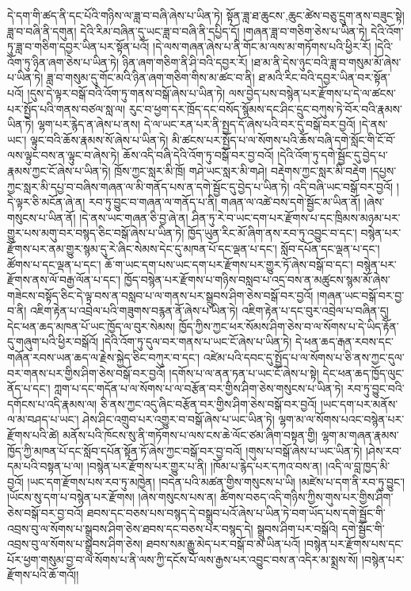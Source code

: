 དེ་དག་གི་ཚད་ནི་དང་པོའི་གཉིས་ལ་ཟླ་བ་བཞི་ཞེས་པ་ཡིན་ཏེ། སྟོན་ཟླ་ཐ་{ཆུངས་,ཆུང་}ཚེས་བཅུ་དྲུག་ནས་བཟུང་སྟེ། ཟླ་བ་བཞི་ནི་དགུན། དེའི་རིམ་བཞིན་དུ་ཡང་ཟླ་བ་བཞི་ནི་དཔྱིད་དོ། །གཞན་ཟླ་བ་གཅིག་ཅེས་པ་ཡིན་ཏེ། དེའི་འོག་ཏུ་ཟླ་བ་གཅིག་དབྱར་ཡིན་པར་སྟོན་པའོ། །དེ་ལས་གཞན་ཞེས་པ་ནི་གོང་མ་ལས་མ་གཏོགས་པའི་ཕྱིར་རོ། །དེའི་འོག་ཏུ་ཉིན་ཞག་ཅེས་པ་ཡིན་ཏེ། ཉིན་ཞག་གཅིག་ནི་ཤི་བའི་དབྱར་རོ། །ཐ་མ་ནི་དེས་ཉུང་བའི་ཟླ་བ་གསུམ་མོ་ཞེས་པ་ཡིན་ཏེ། ཟླ་བ་གསུམ་དུ་གོང་མའི་ཉིན་ཞག་གཅིག་གིས་མ་ཚང་བ་ནི། ཐ་མའི་རིང་བའི་དབྱར་ཡིན་བར་སྟོན་པའོ། །དུས་དེ་ལྟར་བསྒོ་བའི་འོག་ཏུ་གནས་བསྒོ་ཞེས་པ་ཡིན་ཏེ། ལས་བྱེད་པས་བསྙེན་པར་རྫོགས་པ་དེ་ལ་ཚངས་པར་སྤྱོད་པའི་གནས་བཙལ་སླ་ལ། རུང་བ་ཕྱག་དར་ཁྲོད་དང་བསོད་སྙོམས་དང་ཤིང་དྲུང་བཀུས་ཏེ་བོར་བའི་རྣམས་ཡིན་ཏེ། ལྷག་པར་རྙེད་ན་ཞེས་པ་ནས། དེ་ལ་ཡང་རན་པར་ནི་སྤྱད་དོ་ཞེས་པའི་བར་དུ་བསྒོ་བར་བྱའོ། །དེ་ནས་ཡང་། ལྟུང་བའི་ཆོས་རྣམས་སོ་ཞེས་པ་ཡིན་ཏེ། མི་ཚངས་པར་སྤྱོད་པ་ལ་སོགས་པའི་ཆོས་བཞི་དགེ་སློང་གི་ངོ་བོ་ལས་ལྟུང་བས་ན་ལྟུང་བ་ཞེས་ཏེ། ཆོས་འདི་བཞི་དེའི་འོག་ཏུ་བསྒོ་བར་བྱ་བའོ། །དེའི་འོག་ཏུ་དགེ་སྦྱོང་དུ་བྱེད་པ་རྣམས་ཀྱང་ངོ་ཞེས་པ་ཡིན་ཏེ། ཁྲོས་ཀྱང་སླར་མི་ཁྲོ། གཤེ་ཡང་སླར་མི་གཤེ། བརྡེགས་ཀྱང་སླར་མི་བརྡེག །དཔྱས་ཀྱང་སླར་མི་དཔྱ་བ་བཞིས་གཞན་ལ་མི་གནོད་པས་ན་དགེ་སྦྱོང་དུ་བྱེད་པ་ཡིན་ཏེ། འདི་བཞི་ཡང་བསྒོ་བར་བྱའོ། །དེ་ལྟར་ཅི་མངོན་ཞེ་ན། རབ་ཏུ་བྱུང་བ་གཞན་ལ་གནོད་པ་ནི། གཞན་ལ་འཚེ་བས་དགེ་སྦྱོང་མ་ཡིན་ནོ། །ཞེས་གསུངས་པ་ཡིན་ནོ། །དེ་ནས་ཡང་གཞན་ཅི་བྱ་ཞེ་ན། ཤིན་ཏུ་རེ་བ་ཡང་དག་པར་རྫོགས་པ་དང་ཁྲིམས་མཉམ་པར་གྱུར་པས་མགུ་བར་བསྙད་ཅིང་བསྒོ་ཞེས་པ་ཡིན་ཏེ། ཁྱོད་ཡུན་རིང་མོ་ཞིག་ནས་རབ་ཏུ་འབྱུང་བ་དང་། བསྙེན་པར་རྫོགས་པར་ནམ་གྱུར་སྙམ་དུ་རེ་ཞིང་སེམས་དེང་དུ་མཁན་པོ་དང་ལྡན་པ་དང་། སློབ་དཔོན་དང་ལྡན་པ་དང་། ཚོགས་པ་དང་ལྡན་པ་དང་། ཆོ་ག་ཡང་དག་པས་ཡང་དག་པར་རྫོགས་པར་གྱུར་ཏོ་ཞེས་བསྒོ་བ་དང་། བསྙེན་པར་རྫོགས་ནས་ལོ་བརྒྱ་ལོན་པ་དང་། ཁྱོད་བསྙེན་པར་རྫོགས་པ་གཉིས་བསླབ་པ་འདྲ་བས་ན་མཚུངས་སྙམ་མོ་ཞེས་གཟེངས་བསྟོད་ཅིང་དེ་ལྟ་བས་ན་བསླབ་པ་ལ་གནས་པར་སྒྲུབས་ཤིག་ཅེས་བསྒོ་བར་བྱའོ། །གཞན་ཡང་བསྒོ་བར་བྱ་བ་ནི། འཇིག་རྟེན་པ་འབྲེལ་པའི་གཟུགས་བརྙན་ནོ་ཞེས་པ་ཡིན་ཏེ། འཇིག་རྟེན་པ་དང་བུར་འབྲེལ་པ་བཞིན་དུ། དེང་ཕན་ཆད་མཁན་པོ་ཡང་ཁྱོད་ལ་བུར་སེམས། ཁྱོད་ཀྱིས་ཀྱང་ཕར་སོམས་ཤིག་ཅེས་བ་ལ་སོགས་པ་དེ་ཡིད་རྟོན་དུ་གཞུག་པའི་ཕྱིར་བསྒོའོ། །དེའི་འོག་ཏུ་དུལ་བར་གནས་པ་ཡང་ངོ་ཞེས་པ་ཡིན་ཏེ། དེ་ཕན་ཆད་རྒན་རབས་དང་གཞོན་རབས་ཡན་ཆད་ལ་རྗེས་སྐྱེད་ཅིང་བཀུར་བ་དང་། འཛེམ་པའི་དབང་དུ་སྤྱོད་པ་ལ་སོགས་པ་ཅི་ནས་ཀྱང་དུལ་བར་གནས་པར་གྱིས་ཤིག་ཅེས་བསྒོ་བར་བྱའོ། །དགོས་པ་ལ་ནན་ཏན་པ་ཡང་ངོ་ཞེས་པ་སྟེ། དེང་ཕན་ཆད་ཁྱོད་ལུང་ནོད་པ་དང་། ཀླག་པ་དང་གདོན་པ་ལ་སོགས་པ་ལ་བརྩོན་བར་གྱིས་ཤིག་ཅེས་གསུངས་པ་ཡིན་ཏེ། རབ་ཏུ་བྱུང་བའི་དགོངས་པ་འདི་རྣམས་ལ། ཅི་ནས་ཀྱང་འདུ་ཞིང་བརྩོན་བར་གྱིས་ཤིག་ཅེས་བསྒོ་བར་བྱའོ། །ཡང་དག་པར་མནོས་ལ་མ་བཤད་པ་ཡང་། ཤེས་ཤིང་འགྲུབ་པར་འགྱུར་བ་བསྒོ་ཞེས་པ་ཡང་ཡིན་ཏེ། ལྷག་མ་ལ་སོགས་པའང་བསྙེན་པར་རྫོགས་པའི་ཚེ། མནོས་པའི་ཁོངས་སུ་ནི་གཏོགས་པ་ལས་ངས་ཆེ་ལོང་ཙམ་ཞིག་བསྟན་གྱི། ལྷག་མ་གཞན་རྣམས་ཁྱོད་ཀྱི་མཁན་པོ་དང་སློབ་དཔོན་སྟོན་ཏོ་ཞེས་ཀྱང་བསྒོ་བར་བྱ་བའོ། །གུས་པ་བསྒོ་ཞེས་པ་ཡང་ཡིན་ཏེ། །ཤེས་རབ་དམ་པའི་བསྟན་པ་ལ། །བསྙེན་པར་རྫོགས་པར་གྱུར་པ་ནི། །ཁོམ་པ་རྙེད་པར་དཀའ་བས་ན། །འདི་ལ་བླ་ཁྱད་མི་བྱའོ། །ཡང་དག་རྫོགས་པས་རབ་ཏུ་མཁྱེན། །བདེན་པའི་མཚན་གྱིས་གསུངས་པ་ཡི། །མཛེས་པ་དག་ནི་རབ་ཏུ་བྱུང་། །ཡོངས་སུ་དག་པ་བསྙེན་པར་རྫོགས། །ཞེས་གསུངས་པས་ན། ཚིགས་བཅད་འདི་གཉིས་ཀྱིས་གུས་པར་གྱིས་ཤིག་ཅེས་བསྒོ་བར་བྱ་བའོ། ཐབས་དང་བཅས་པས་བསྙད་དེ་བསྒྲུབ་པའོ་ཞེས་པ་ཡིན་ཏེ་བག་ཡོད་པས་དགེ་སྦྱོང་གི་འབྲས་བུ་ལ་སོགས་པ་སྒྲུབས་ཤིག་ཅེས་ཐབས་དང་བཅས་པར་བསྙད་དེ། སྒྲུབས་ཤིག་པར་བསྒོའི། དགེ་སྦྱོང་གི་འབྲས་བུ་ལ་སོགས་པ་སྒྲུབས་ཤིག་ཅེས། ཐབས་སམ་རྒྱུ་མེད་པར་བསྒོ་བ་མ་ཡིན་པའོ། །བསྙེན་པར་རྫོགས་པས་དང་པོར་ཕྱག་གསུམ་བྱ་བ་ལ་སོགས་པ་ནི་ལས་ཀྱི་དངོས་པོ་ལས་རྒྱས་པར་འབྱུང་བས་ན་འདིར་མ་སྨྲས་སོ། །བསྙེན་པར་རྫོགས་པའི་ཆོ་གའོ།། 